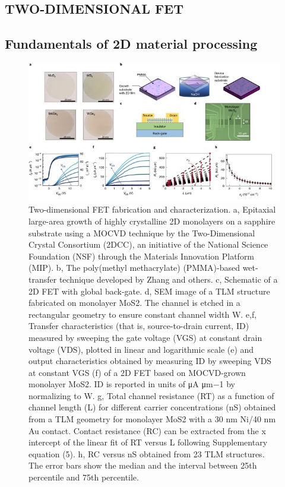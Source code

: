 \documentclass[12pt,a4paper]{report}
\begin{document}
\begin{itemize}
\chapter{TWO-DIMENSIONAL FET}
\section{Fundamentals of 2D material processing}
\begin{figure}
  \centering
  \includegraphics[scale=1]{twodimensionalfet.jpg}
  \caption{Two-dimensional FET fabrication and characterization. a, Epitaxial large-area growth of highly crystalline 2D monolayers on a sapphire substrate using a MOCVD technique by the Two-Dimensional Crystal Consortium (2DCC), an initiative of the National Science Foundation (NSF) through the Materials Innovation Platform (MIP). b, The poly(methyl methacrylate) (PMMA)-based wet-transfer technique developed by Zhang and others. c, Schematic of a 2D FET with global back-gate. d, SEM image of a TLM structure fabricated on monolayer MoS2. The channel is etched in a rectangular geometry to ensure constant channel width W. e,f, Transfer characteristics (that is, source-to-drain current, ID) measured by sweeping the gate voltage (VGS) at constant drain voltage (VDS), plotted in linear and logarithmic scale (e) and output characteristics obtained by measuring ID by sweeping VDS at
  constant VGS (f) of a 2D FET based on MOCVD-grown monolayer MoS2. ID is reported in units of μA μm−1 by normalizing to W. g, Total channel resistance (RT) as a function of channel length (L) for different carrier concentrations (nS) obtained from a TLM geometry for monolayer MoS2 with a 30 nm Ni/40 nm Au contact. Contact resistance (RC) can be extracted from the x intercept of the linear fit of RT versus L following Supplementary equation (5). h, RC versus nS obtained from 23 TLM structures. The error bars show the median and the interval between 25th percentile and 75th percentile. }
  \label{tdf}
  \end{figure}


\end{itemize}
\end{document}
